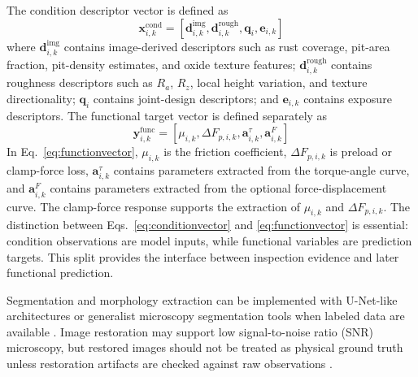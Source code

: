 \documentclass[colorlinks,upint,subscriptcorrection,varvw,hyphenate,balance]{asmeconf}
\newcommand{\vect}[1]{\bm{#1}}
\begin{document}
The condition descriptor vector is defined as
\begin{equation}
\vect{x}^{\mathrm{cond}}_{i,k}=\left[\vect{d}^{\mathrm{img}}_{i,k},\vect{d}^{\mathrm{rough}}_{i,k},\vect{q}_{i},\vect{e}_{i,k}\right]
\label{eq:conditionvector}
\end{equation}
where $\vect{d}^{\mathrm{img}}_{i,k}$ contains image-derived descriptors such as rust coverage, pit-area fraction, pit-density estimates, and oxide texture features; $\vect{d}^{\mathrm{rough}}_{i,k}$ contains roughness descriptors such as $R_a$, $R_z$, local height variation, and texture directionality; $\vect{q}_{i}$ contains joint-design descriptors; and $\vect{e}_{i,k}$ contains exposure descriptors. The functional target vector is defined separately as
\begin{equation}
\vect{y}^{\mathrm{func}}_{i,k}=\left[\mu_{i,k},\Delta F_{p,i,k},\vect{a}^{\tau}_{i,k},\vect{a}^{F}_{i,k}\right]
\label{eq:functionvector}
\end{equation}
In Eq.~\eqref{eq:functionvector}, $\mu_{i,k}$ is the friction coefficient, $\Delta F_{p,i,k}$ is preload or clamp-force loss, $\vect{a}^{\tau}_{i,k}$ contains parameters extracted from the torque-angle curve, and $\vect{a}^{F}_{i,k}$ contains parameters extracted from the optional force-displacement curve. The clamp-force response supports the extraction of $\mu_{i,k}$ and $\Delta F_{p,i,k}$. The distinction between Eqs.~\eqref{eq:conditionvector} and \eqref{eq:functionvector} is essential: condition observations are model inputs, while functional variables are prediction targets.
This split provides the interface between inspection evidence and later functional prediction.

Segmentation and morphology extraction can be implemented with U-Net-like architectures or generalist microscopy segmentation tools when labeled data are available \cite{ronneberger2015unet,stringer2021cellpose}.
Image restoration may support low signal-to-noise ratio (SNR) microscopy, but restored images should not be treated as physical ground truth unless restoration artifacts are checked against raw observations \cite{weigert2018care,lehtinen2018noise2noise}.
\end{document}
